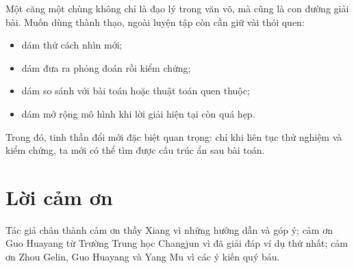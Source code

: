 \documentclass[11pt]{article}
\begin{document}
Một căng một chùng không chỉ là đạo lý trong văn võ, mà cũng là con đường giải
bài. Muốn dùng thành thạo, ngoài luyện tập còn cần giữ vài thói quen:
\begin{itemize}
  \item dám thử cách nhìn mới;
  \item dám đưa ra phỏng đoán rồi kiểm chứng;
  \item dám so sánh với bài toán hoặc thuật toán quen thuộc;
  \item dám mở rộng mô hình khi lời giải hiện tại còn quá hẹp.
\end{itemize}
Trong đó, tinh thần đổi mới đặc biệt quan trọng: chỉ khi liên tục thử nghiệm
và kiểm chứng, ta mới có thể tìm được cấu trúc ẩn sau bài toán.

\section*{Lời cảm ơn}

Tác giả chân thành cảm ơn thầy Xiang vì những hướng dẫn và góp ý; cảm ơn Guo
Huayang từ Trường Trung học Changjun vì đã giải đáp ví dụ thứ nhất; cảm ơn
Zhou Gelin, Guo Huayang và Yang Mu vì các ý kiến quý báu.
\end{document}
